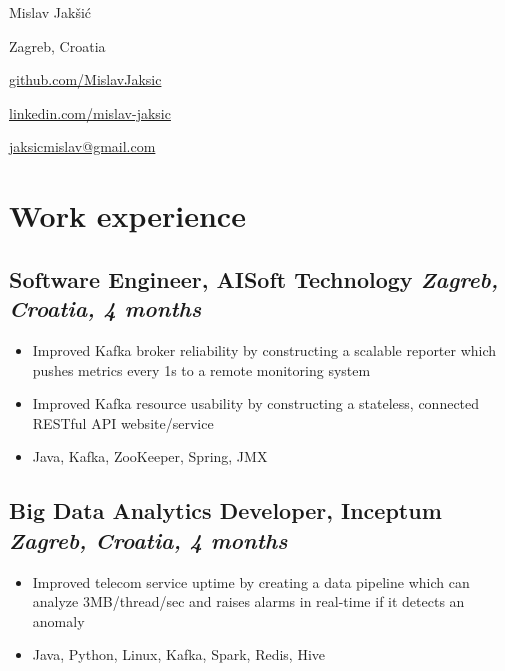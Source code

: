 \documentclass[a4paper]{article}
\newcommand{\bolditalicpair}
[2]
{\textbf{#1} \texorpdfstring{\hfill}{} \textit{#2}}
\begin{document}
\begin{multicols}{2}

\noindent
\begin{minipage}{.49\textwidth}
\raggedright

{\huge Mislav Jakšić}

Zagreb, Croatia
\end{minipage}

\noindent
\begin{minipage}{.49\textwidth}
\raggedleft

\href{https://github.com/MislavJaksic}{github.com/MislavJaksic}

\href{https://linkedin.com/in/mislav-jaksic}{linkedin.com/mislav-jaksic}

\href{mailto:jaksicmislav@gmail.com}{jaksicmislav@gmail.com}

\end{minipage}

\end{multicols}



\section{Work experience}
\subsection{\bolditalicpair{Software Engineer, AISoft Technology}{Zagreb, Croatia, 4 months}}

\begin{itemize}
  \item Improved Kafka broker reliability by constructing a scalable reporter which pushes metrics every 1s to a remote monitoring system
  \item Improved Kafka resource usability by constructing a stateless, connected RESTful API website/service
  \item Java, Kafka, ZooKeeper, Spring, JMX
\end{itemize}

\subsection{\bolditalicpair{Big Data Analytics Developer, Inceptum}{Zagreb, Croatia, 4 months}}

\begin{itemize}
  \item Improved telecom service uptime by creating a data pipeline which can analyze 3MB/thread/sec and raises alarms in real-time if it detects an anomaly
  \item Java, Python, Linux, Kafka, Spark, Redis, Hive
\end{itemize}
\end{document}
